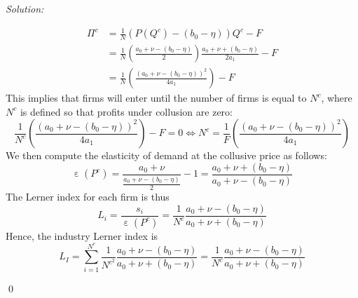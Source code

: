 \documentclass[12pt]{article}
\DeclareMathOperator{\eps}{\varepsilon}
\newenvironment{sol}
    {\emph{Solution:}
    }
    {
    \qed
    }
\begin{document}
\begin{sol}
\begin{enumerate}[label=\alph*) ]
     \begin{align*}\Pi^c &= \frac{1}{N} \left( P(Q^c) - (b_0 - \eta)\right)Q^c - F\\
        &= \frac{1}{N} \left(\frac{a_0 + \nu - (b_0 - \eta)}{2} \right)\frac{a_0 + \nu + (b_0 - \eta)}{2 a_1} - F\\
        &= \frac{1}{N}\left( \frac{(a_0 + \nu - (b_0 - \eta))^2}{4 a_1}\right) - F
    \end{align*}
    This implies that firms will enter until the number of firms is equal to $N^c$, where $N^c$ is defined so that profits under collusion are zero:
\[\frac{1}{N^c}\left( \frac{(a_0 + \nu - (b_0 - \eta))^2}{4 a_1}\right) - F = 0 \iff N^c = \frac{1}{F}\left( \frac{(a_0 + \nu - (b_0 - \eta))^2}{4 a_1}\right)\]
We then compute the elasticity of demand at the collusive price as follows:
\[\eps(P^c) = \frac{a_0 + \nu}{\frac{a_0 + \nu - (b_0 - \eta)}{2}} - 1 = \frac{a_0 + \nu + (b_0 - \eta)}{a_0 + \nu - (b_0 - \eta)}\]
The Lerner index for each firm is thus
\[L_i = \frac{s_i}{\eps(P^c)} = \frac{1}{N^c} \frac{a_0 + \nu - (b_0 - \eta)}{a_0 + \nu + (b_0 - \eta)}\]
Hence, the industry Lerner index is
\[L_I = \sum_{i=1}^{N^c} \frac{1}{N^c^2 }\frac{a_0 + \nu - (b_0 - \eta)}{a_0 + \nu + (b_0 - \eta)} = \frac{1}{N^c}\frac{a_0 + \nu - (b_0 - \eta)}{a_0 + \nu + (b_0 - \eta)} \]
\end{enumerate}


\end{sol}
\end{document}
